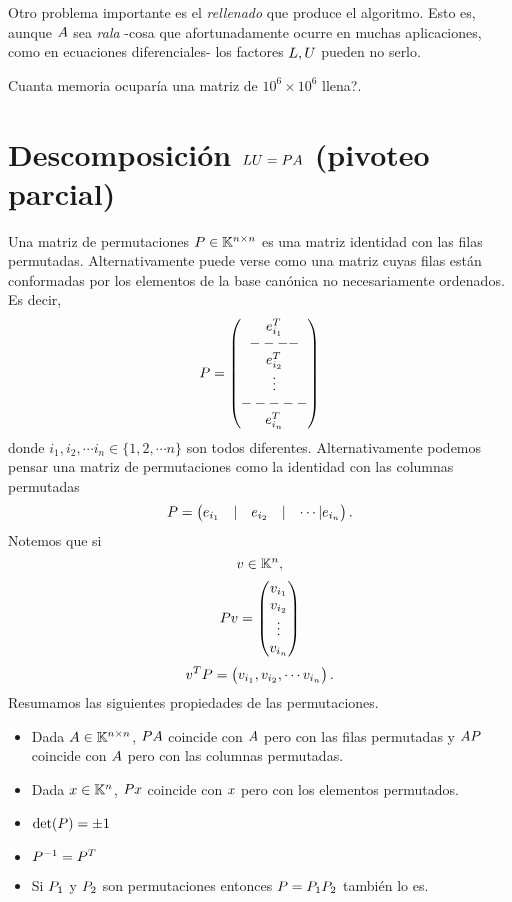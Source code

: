 \begin{tcolorbox}
Otro problema importante es el \emph{rellenado} que produce el algoritmo. Esto es, aunque $\Ab$ sea \emph{rala} -cosa que afortunadamente ocurre en muchas aplicaciones, como en ecuaciones diferenciales- los factores $\Lb,\Ub$ pueden no serlo.

\begin{ejercicio}
 Cuanta memoria ocuparía una matriz
 de $10^6\times 10^6$ llena?.
\end{ejercicio}



\section{Descomposición $\Lb\Ub=\Pb\Ab$ (pivoteo parcial)}

Una matriz de permutaciones $\Pb\in \Knn$
es una matriz identidad con las filas permutadas. Alternativamente puede verse como una matriz cuyas filas están conformadas por los elementos de la base canónica no necesariamente ordenados. Es decir,
$$
\Pb=
\begin{pmatrix}
 \eb_{i_1}^T \\
 ---- \\
 \eb_{i_2}^T\\
 \vdots

 \\
 -----\\
 \eb_{i_n}^T
\end{pmatrix}
$$
donde $i_1,i_2,\cdots i_n\in \{1,2,\cdots n\}$ son todos diferentes. Alternativamente podemos pensar una matriz de permutaciones como la identidad con las columnas permutadas
$$
\Pb=
\begin{pmatrix}
 \eb_{i_1}&|& \eb_{i_2}&|&\cdots |\eb_{i_n}
\end{pmatrix}.
$$
Notemos que si
$$
\vb \in \Kn,
$$
$$
\Pb\vb=
\begin{pmatrix}
 v_{i_1}\\
 v_{i_2}\\
 \vdots \\
 v_{i_n}
\end{pmatrix}
$$
$$
\vb^T\Pb=
\begin{pmatrix}
 v_{i_1},
 v_{i_2},
 \cdots
 v_{i_n}
\end{pmatrix}.
$$
Resumamos las siguientes propiedades de las permutaciones.
\begin{itemize}
 \item Dada $\Ab\in \Knn$, $\Pb\Ab$ coincide con $\Ab$ pero con las filas permutadas y $\Ab\Pb$ coincide con $\Ab$ pero con las columnas permutadas.
 \item Dada $\xb\in \Kn$, $\Pb\xb$ coincide con $\xb$ pero con los elementos permutados.
 \item $\det(\Pb)=\pm 1$
 \item $\Pb^{-1}=\Pb^T$
 \item Si $\Pb_1$ y $\Pb_2$ son permutaciones entonces $\Pb=\Pb_1\Pb_2$ también lo es.
\end{itemize}



\end{tcolorbox}
